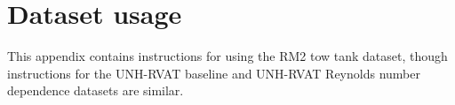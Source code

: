 \chapter{Dataset usage}
\doublespace

This appendix contains instructions for using the RM2 tow tank dataset, though
instructions for the UNH-RVAT baseline and UNH-RVAT Reynolds number dependence
datasets are similar.



